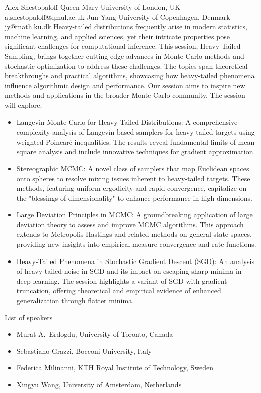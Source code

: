 \begin{session}
 {Alex Shestopaloff}%
 {Queen Mary University of London, UK}%
 {a.shestopaloff@qmul.ac.uk}%
 {Jun Yang}%
 {University of Copenhagen, Denmark}%
 {jy@math.ku.dk}%
 Heavy-tailed distributions frequently arise in modern statistics, machine learning, and applied sciences, yet their intricate properties pose significant challenges for computational inference. This session, Heavy-Tailed Sampling, brings together cutting-edge advances in Monte Carlo methods and stochastic optimization to address these challenges. The topics span theoretical breakthroughs and practical algorithms, showcasing how heavy-tailed phenomena influence algorithmic design and performance. Our session aims to inspire new methods and applications in the broader Monte Carlo community. The session will explore:
 \begin{itemize}
 \item
 Langevin Monte Carlo for Heavy-Tailed Distributions: A comprehensive complexity analysis of Langevin-based samplers for heavy-tailed targets using weighted Poincaré inequalities. The results reveal fundamental limits of mean-square analysis and include innovative techniques for gradient approximation.
 \item
 Stereographic MCMC: A novel class of samplers that map Euclidean spaces onto spheres to resolve mixing issues inherent to heavy-tailed targets. These methods, featuring uniform ergodicity and rapid convergence, capitalize on the "blessings of dimensionality" to enhance performance in high dimensions.
 \item
 Large Deviation Principles in MCMC: A groundbreaking application of large deviation theory to assess and improve MCMC algorithms. This approach extends to Metropolis-Hastings and related methods on general state spaces, providing new insights into empirical measure convergence and rate functions.
 \item
 Heavy-Tailed Phenomena in Stochastic Gradient Descent (SGD): An analysis of heavy-tailed noise in SGD and its impact on escaping sharp minima in deep learning. The session highlights a variant of SGD with gradient truncation, offering theoretical and empirical evidence of enhanced generalization through flatter minima.
 \end{itemize}
 \medskip
 List of speakers
 \begin{itemize}
 \item Murat A.~Erdogdu, University of Toronto, Canada
 \item Sebastiano Grazzi, Bocconi University, Italy
 \item Federica Milinanni, KTH Royal Institute of Technology, Sweden
 \item Xingyu Wang,  University of Amsterdam, Netherlands
 \end{itemize}
\end{session}

